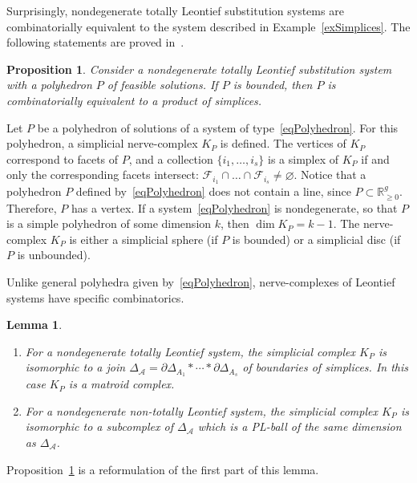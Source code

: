 \documentclass[english,12pt,oneside]{amsproc}
\newcommand{\Rg}{\mathbb{R}_{\geqslant 0}}
\newcommand{\ca}[1]{\mathcal{#1}}
\newcommand{\dd}{\partial}
\newcommand{\F}{\mathcal{F}}
\newcounter{stmcounter}[section]
\numberwithin{equation}{section}
\theoremstyle{plain}
\newtheorem{prop}[stmcounter]{Proposition}
\newtheorem{lem}[stmcounter]{Lemma}
\theoremstyle{definition}
\theoremstyle{remark}
\begin{document}
Surprisingly, nondegenerate totally Leontief substitution systems are combinatorially equivalent to the system described in Example~\ref{exSimplices}. The following statements are proved in~\cite{BilProv}.

\begin{prop}\label{propBillProvEconomy}
Consider a nondegenerate totally Leontief substitution system with a polyhedron $P$ of feasible solutions. If $P$ is bounded, then $P$ is combinatorially equivalent to a product of simplices.
\end{prop}

Let $P$ be a polyhedron of solutions of a system of type~\eqref{eqPolyhedron}. For this polyhedron, a simplicial nerve-complex $K_P$ is defined. The vertices of $K_P$ correspond to facets of $P$, and a collection $\{i_1,\ldots,i_s\}$ is a simplex of $K_P$ if and only the corresponding facets intersect: $\F_{i_1}\cap\ldots\cap\F_{i_s}\neq\varnothing$. Notice that a polyhedron $P$ defined by~\eqref{eqPolyhedron} does not contain a line, since $P\subset\Rg^g$. Therefore, $P$ has a vertex. If a system~\eqref{eqPolyhedron} is nondegenerate, so that $P$ is a simple polyhedron of some dimension $k$, then $\dim K_P=k-1$. The nerve-complex $K_P$ is either a simplicial sphere (if $P$ is bounded) or a simplicial disc (if $P$ is unbounded).

Unlike general polyhedra given by~\eqref{eqPolyhedron}, nerve-complexes of Leontief systems have specific combinatorics.

\begin{lem}\label{lemLeonIsMatroid}\mbox{}
\begin{enumerate}
  \item For a nondegenerate totally Leontief system, the simplicial complex $K_P$ is isomorphic to a join $\Delta_{\ca{A}}=\dd\Delta_{A_1}\ast\cdots\ast \dd\Delta_{A_s}$ of boundaries of simplices. In this case $K_P$ is a matroid complex.
  \item For a nondegenerate non-totally Leontief system, the simplicial complex $K_P$ is isomorphic to a subcomplex of $\Delta_{\ca{A}}$ which is a PL-ball of the same dimension as $\Delta_{\ca{A}}$.
\end{enumerate}
\end{lem}

Proposition~\ref{propBillProvEconomy} is a reformulation of the first part of this lemma.
\end{document}
